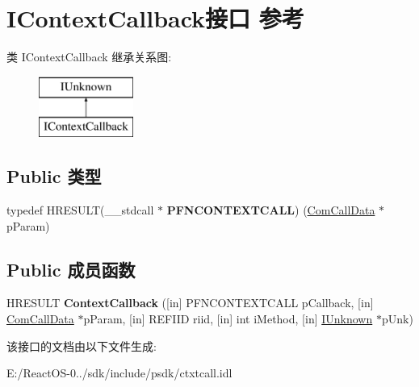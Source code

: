 \hypertarget{interface_i_context_callback}{}\section{I\+Context\+Callback接口 参考}
\label{interface_i_context_callback}
类 I\+Context\+Callback 继承关系图\+:\begin{figure}[H]
\begin{center}
\leavevmode
\includegraphics[height=2.000000cm]{interface_i_context_callback}
\end{center}
\end{figure}
\subsection*{Public 类型}
\begin{DoxyCompactItemize}
\item 
\mbox{\label{interface_i_context_callback_af3d3e8e98947e88a850b8f1500e58a2f}} 
typedef H\+R\+E\+S\+U\+LT(\+\_\+\+\_\+stdcall $\ast$ {\bfseries P\+F\+N\+C\+O\+N\+T\+E\+X\+T\+C\+A\+LL}) (\hyperlink{structtag_com_call_data}{Com\+Call\+Data} $\ast$p\+Param)
\end{DoxyCompactItemize}
\subsection*{Public 成员函数}
\begin{DoxyCompactItemize}
\item 
\mbox{\label{interface_i_context_callback_a91760a87883ff05f677cf2176bf55693}} 
H\+R\+E\+S\+U\+LT {\bfseries Context\+Callback} (\mbox{[}in\mbox{]} P\+F\+N\+C\+O\+N\+T\+E\+X\+T\+C\+A\+LL p\+Callback, \mbox{[}in\mbox{]} \hyperlink{structtag_com_call_data}{Com\+Call\+Data} $\ast$p\+Param, \mbox{[}in\mbox{]} R\+E\+F\+I\+ID riid, \mbox{[}in\mbox{]} int i\+Method, \mbox{[}in\mbox{]} \hyperlink{interface_i_unknown}{I\+Unknown} $\ast$p\+Unk)
\end{DoxyCompactItemize}


该接口的文档由以下文件生成\+:\begin{DoxyCompactItemize}
\item 
E\+:/\+React\+O\+S-\/0../sdk/include/psdk/ctxtcall.\+idl\end{DoxyCompactItemize}
